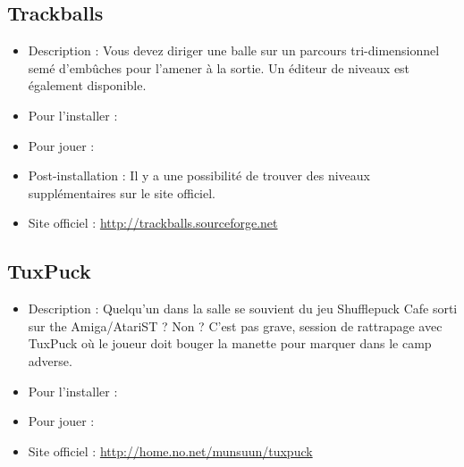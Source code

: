 \subsection{Trackballs}
\begin{itemize}
\begingroup
{}
\item Description : Vous devez diriger une balle sur un parcours tri-dimensionnel semé d'embûches pour l'amener à la sortie. Un éditeur de niveaux est également disponible.{\par}
\item Pour l'installer : 
\endgroup
\item Pour jouer : 
\item Post-installation : Il y a une possibilité de trouver des niveaux supplémentaires sur le site officiel.{\par}
\item Site officiel : \url{http://trackballs.sourceforge.net}{\par}
\end{itemize}
\subsection{TuxPuck}
\begin{itemize}
\begingroup
{}
\item Description : Quelqu'un dans la salle se souvient du jeu Shufflepuck Cafe sorti sur the Amiga/AtariST ? Non ? C'est pas grave, session de rattrapage avec TuxPuck où le joueur doit bouger la manette pour marquer dans le camp adverse.{\par}
\item Pour l'installer : 
\item Pour jouer : 
\item Site officiel : \url{http://home.no.net/munsuun/tuxpuck}{\par}
\endgroup
\end{itemize}
